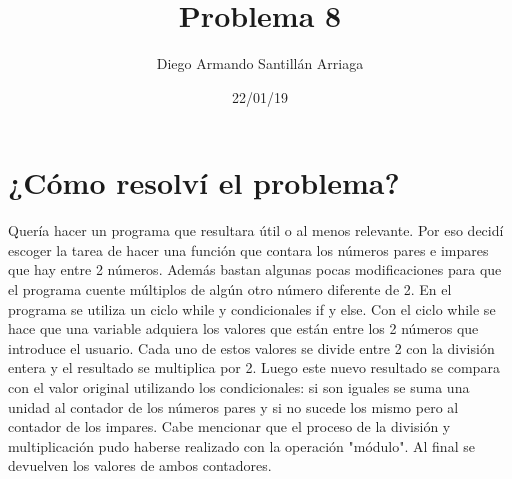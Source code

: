 \documentclass[letterpaper, 12pt, oneside]{article}%
\title{\Huge Problema 8}
\author{Diego Armando Santillán Arriaga}
\date{22/01/19}
\begin{document}
\maketitle
\newpage
\section*{¿Cómo resolví el problema?}
Quería hacer un programa que resultara útil o al menos relevante. Por eso decidí escoger la tarea de hacer una función que contara los números pares e impares que hay entre 2 números. Además bastan algunas pocas modificaciones para que el programa cuente múltiplos de algún otro número diferente de 2.
En el programa se utiliza un ciclo while y condicionales if y else. Con el ciclo while se hace que una variable adquiera los valores que están entre los 2 números que introduce el usuario. Cada uno de estos valores se divide entre 2 con la división entera y el resultado se multiplica por 2. Luego este nuevo resultado se compara con el valor original utilizando los condicionales: si son iguales se suma una unidad al contador de los números pares y si no sucede los mismo pero al contador de los impares. Cabe mencionar que el proceso de la división y multiplicación pudo haberse realizado con la operación "módulo". Al final se devuelven los valores de ambos contadores.
\end{document}
